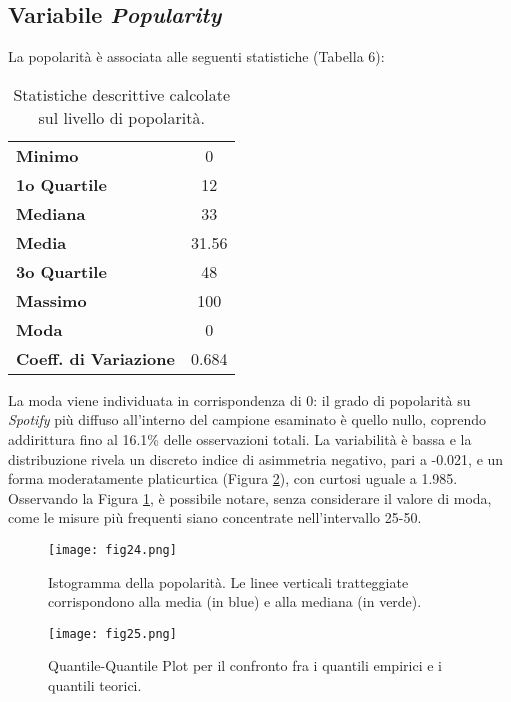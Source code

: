 \documentclass[fleqn,10pt]{SelfArx} %
\begin{document}
\subsection*{Variabile \textit{Popularity}}
La popolarità è associata alle seguenti statistiche (Tabella 6):
{\begin{table}[H]
\centering
\begin{tabular}[t]{lc}
\toprule
\midrule
\textbf{Minimo}&0\\
\textbf{1o Quartile}&12\\
\textbf{Mediana}&33\\
\textbf{Media}&31.56\\
\textbf{3o Quartile}&48\\
\textbf{Massimo}&100\\
\textbf{Moda}&0\\
\textbf{Coeff. di Variazione}&0.684\\
\bottomrule
\end{tabular}
\caption{Statistiche descrittive calcolate sul livello di popolarità.}
\end{table}}
La moda viene individuata in corrispondenza di 0: il grado di popolarità su \textit{Spotify} più diffuso all'interno del campione esaminato è quello nullo, coprendo addirittura fino al 16.1\% delle osservazioni totali. La variabilità è bassa e la distribuzione rivela un discreto indice di asimmetria negativo, pari a -0.021, e un forma moderatamente platicurtica (Figura \ref{fig:fig25}), con curtosi uguale a 1.985. Osservando la Figura \ref{fig:fig24}, è possibile notare, senza considerare il valore di moda, come le misure più frequenti siano concentrate nell'intervallo 25-50.
\begin{figure}[H]
    \centering
    \texttt{[image: fig24.png]}
    \caption{Istogramma della popolarità. Le linee verticali tratteggiate corrispondono alla media (in blue) e alla mediana (in verde).}
    \label{fig:fig24}
\end{figure}
\begin{figure}[H]
    \centering
    \texttt{[image: fig25.png]}
    \caption{Quantile-Quantile Plot per il confronto fra i quantili empirici e i quantili teorici.}
    \label{fig:fig25}
\end{figure}
\end{document}
